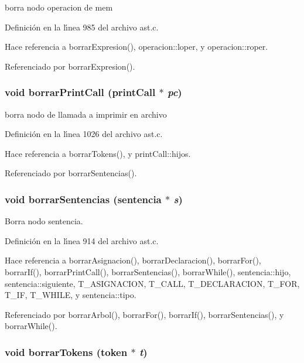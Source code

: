 borra nodo operacion de mem 



Definici\'{o}n en la l\'{\i}nea 985 del archivo ast.c.

Hace referencia a borrar\-Expresion(), operacion::loper, y operacion::roper.

Referenciado por borrar\-Expresion().
\subsubsection{\setlength{\rightskip}{0pt plus 5cm}void borrar\-Print\-Call ({\bf print\-Call} $\ast$ {\em pc})}\label{ast_8h_a69}


borra nodo de llamada a imprimir en archivo 



Definici\'{o}n en la l\'{\i}nea 1026 del archivo ast.c.

Hace referencia a borrar\-Tokens(), y print\-Call::hijos.

Referenciado por borrar\-Sentencias().
\subsubsection{\setlength{\rightskip}{0pt plus 5cm}void borrar\-Sentencias ({\bf sentencia} $\ast$ {\em s})}\label{ast_8h_a61}


Borra nodo sentencia. 



Definici\'{o}n en la l\'{\i}nea 914 del archivo ast.c.

Hace referencia a borrar\-Asignacion(), borrar\-Declaracion(), borrar\-For(), borrar\-If(), borrar\-Print\-Call(), borrar\-Sentencias(), borrar\-While(), sentencia::hijo, sentencia::siguiente, T\_\-ASIGNACION, T\_\-CALL, T\_\-DECLARACION, T\_\-FOR, T\_\-IF, T\_\-WHILE, y sentencia::tipo.

Referenciado por borrar\-Arbol(), borrar\-For(), borrar\-If(), borrar\-Sentencias(), y borrar\-While().
\subsubsection{\setlength{\rightskip}{0pt plus 5cm}void borrar\-Tokens ({\bf token} $\ast$ {\em t})}\label{ast_8h_a70}



